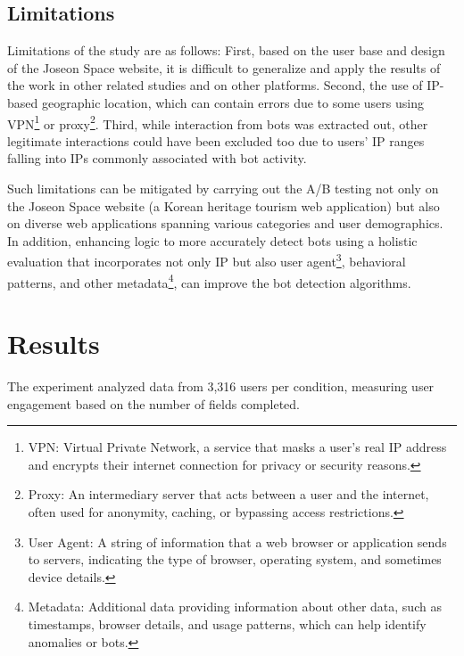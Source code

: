 \documentclass[conference]{IEEEtran}
\begin{document}
\subsection{Limitations}

Limitations of the study are as follows: First, based on the user base and design of the Joseon Space website, it is difficult to generalize and apply the results of the work in other related studies and on other platforms. Second, the use of IP-based geographic location, which can contain errors due to some users using VPN\footnote{VPN: Virtual Private Network, a service that masks a user's real IP address and encrypts their internet connection for privacy or security reasons.} or proxy\footnote{Proxy: An intermediary server that acts between a user and the internet, often used for anonymity, caching, or bypassing access restrictions.}. Third, while interaction from bots was extracted out, other legitimate interactions could have been excluded too due to users' IP ranges falling into IPs commonly associated with bot activity.

Such limitations can be mitigated by carrying out the A/B testing not only on the Joseon Space website (a Korean heritage tourism web application) but also on diverse web applications spanning various categories and user demographics. In addition, enhancing logic to more accurately detect bots using a holistic evaluation that incorporates not only IP but also user agent\footnote{User Agent: A string of information that a web browser or application sends to servers, indicating the type of browser, operating system, and sometimes device details.}, behavioral patterns, and other metadata\footnote{Metadata: Additional data providing information about other data, such as timestamps, browser details, and usage patterns, which can help identify anomalies or bots.}, can improve the bot detection algorithms.



\section{Results}
\label{sec:results}

The experiment analyzed data from 3,316 users per condition, measuring user engagement based on the number of fields completed.
\end{document}
